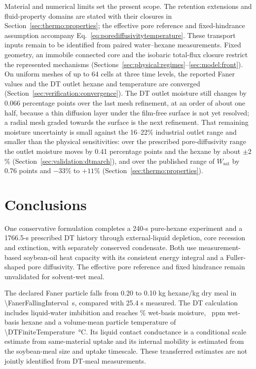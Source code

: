 \label{sec:discussion:extrapolation}\label{sec:discussion:geometry}\label{sec:discussion:limits}
Material and numerical limits set the present scope. The retention
extensions and fluid-property domains are stated with their closures in
Section~\ref{sec:thermo:properties}; the effective pore reference and
fixed-hindrance assumption accompany Eq.~\eqref{eq:porediffusivitytemperature}.
These transport inputs remain to be identified from paired water--hexane
measurements. Fixed geometry, an immobile connected core and the isobaric
total-flux closure restrict the represented mechanisms
(Sections~\ref{sec:physical:regimes}--\ref{sec:model:front}).
On uniform meshes of up to 64 cells at three time levels, the reported
Faner values and the DT outlet hexane and temperature are converged
(Section~\ref{sec:verification:convergence}). The DT outlet moisture still
changes by 0.066 percentage points over the last mesh refinement, at an
order of about one half, because a thin diffusion layer under the
film-free surface is not yet resolved; a radial mesh graded towards the
surface is the next refinement. That remaining moisture uncertainty is small against the
16--22\% industrial outlet range and smaller than the physical
sensitivities: over the prescribed pore-diffusivity range the outlet
moisture moves by 0.41 percentage points and the hexane by about
$\pm2$\% (Section~\ref{sec:validation:dtmarch}), and over the published
range of $W_{\mathrm{sat}}$ by 0.76 points and $-33$\% to $+11$\%
(Section~\ref{sec:thermo:properties}).

\section{Conclusions}\label{sec:conclusions}\label{sec:discussion:measurements}
One conservative formulation completes a 240-s pure-hexane experiment
and a 1766.5-s prescribed DT history through external-liquid depletion,
core recession and extinction, with separately conserved condensate.
Both use measurement-based soybean-oil heat capacity with its consistent
energy integral and a Fuller-shaped pore diffusivity. The effective pore
reference and fixed hindrance remain unvalidated for solvent-wet meal.

The declared Faner particle falls from 0.20 to 0.10 kg hexane/kg dry meal
in \SI{\FanerFallingInterval}{\second}, compared with 25.4 s measured. The DT calculation includes liquid-water imbibition
and reaches \DTFiniteMoisture\% wet-basis moisture, \DTFiniteHexaneWet\ ppm wet-basis hexane and a
volume-mean particle temperature of \SI{\DTFiniteTemperature}{\celsius}. Its liquid
contact conductance is a conditional scale estimate from same-material
uptake and its internal mobility is estimated from the soybean-meal
size and uptake timescale. These transferred estimates are not jointly
identified from DT-meal measurements.

